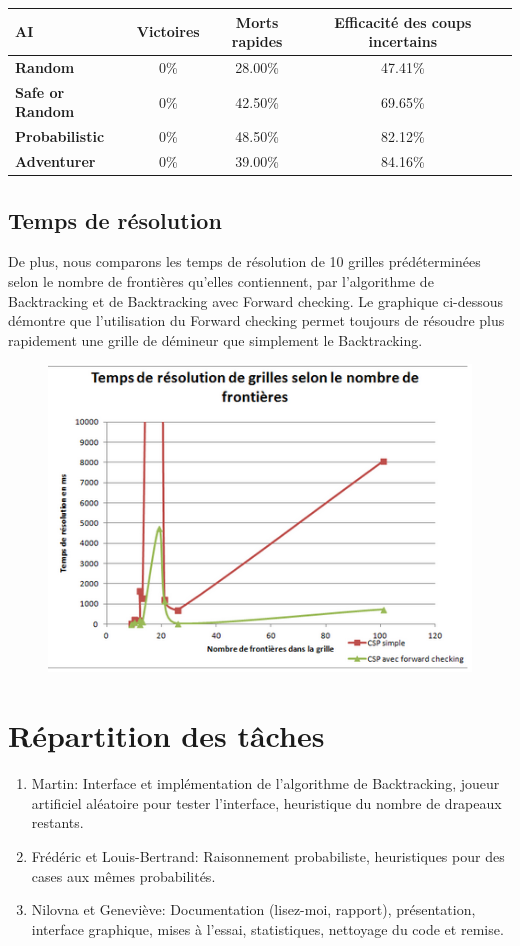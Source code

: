 \documentclass{article}
\begin{document}
\begin{tabular}{| l | c | c | c | c | }
        \hline
	\textbf{AI} & \textbf{Victoires} & \textbf{Morts rapides} & \textbf{ Efficacité des coups incertains} \\
        \hline
	\textbf{Random} & 0\% & 28.00\% & 47.41\% \\
        \hline
	\textbf{Safe or Random} & 0\% & 42.50\% & 69.65\% \\
        \hline
	\textbf{Probabilistic} & 0\% & 48.50\% & 82.12\% \\
        \hline
	\textbf{Adventurer} & 0\% & 39.00\% & 84.16\% \\
        \hline
\end{tabular}

\subsection{Temps de résolution}
De plus, nous comparons les temps de résolution de 10 grilles prédéterminées selon le nombre de 
frontières qu’elles contiennent, par l'algorithme de Backtracking et de Backtracking avec Forward checking.
Le graphique ci-dessous démontre que l’utilisation du Forward checking permet toujours de 
résoudre plus rapidement une grille de démineur que simplement le Backtracking.

\begin{figure}[h!]
  \centering
  \includegraphics[scale=.35]{./vitesse.png}
\end{figure}

\section{Répartition des tâches}
\begin{enumerate}
        \item Martin: Interface et implémentation de l’algorithme de Backtracking, joueur artificiel aléatoire pour tester 
              l’interface, heuristique du nombre de drapeaux restants.
        \item Frédéric et Louis-Bertrand: Raisonnement probabiliste, heuristiques pour des cases aux mêmes probabilités.
        \item Nilovna et Geneviève: Documentation (lisez-moi, rapport), présentation, 
              interface graphique, mises à l’essai, statistiques, nettoyage du code et remise.
\end{enumerate}
\end{document}

